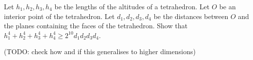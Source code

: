 Let $h_1, h_2, h_3, h_4$ be the lengths of the altitudes of a tetrahedron.
Let $O$ be an interior point of the tetrahedron.
Let $d_1, d_2, d_3, d_4$ be the distances between $O$
and the planes containing the faces of the tetrahedron.
Show that
$h_1^4 + h_2^4 + h_3^4 + h_4^4
 \geq
 2^{10} d_1 d_2 d_3 d_4$.

(TODO: check how and if this generalises to higher dimensions)
